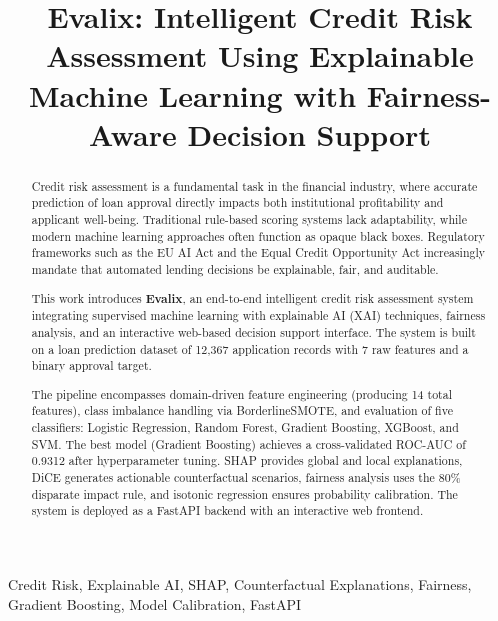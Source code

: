 \documentclass[journal]{IEEEtran}
\title{Evalix: Intelligent Credit Risk Assessment Using Explainable Machine Learning with Fairness-Aware Decision Support}
\author{
  \IEEEauthorblockN{Raswanthkrishna~M}
  \IEEEauthorblockA{
    Department of Computer Science Engineering -- Artificial Intelligence\\
    Amrita School of Artificial Intelligence,
    Amrita Vishwa Vidyapeetham, Coimbatore, India\\
    \textit{Guide: Sreekumar K.T., Assistant Professor}
  }
}
\begin{document}
\maketitle

\begin{abstract}
Credit risk assessment is a fundamental task in the financial industry, where accurate prediction of loan approval directly impacts both institutional profitability and applicant well-being. Traditional rule-based scoring systems lack adaptability, while modern machine learning approaches often function as opaque black boxes. Regulatory frameworks such as the EU AI Act and the Equal Credit Opportunity Act increasingly mandate that automated lending decisions be explainable, fair, and auditable.

This work introduces \textbf{Evalix}, an end-to-end intelligent credit risk assessment system integrating supervised machine learning with explainable AI (XAI) techniques, fairness analysis, and an interactive web-based decision support interface. The system is built on a loan prediction dataset of 12,367 application records with 7 raw features and a binary approval target.

The pipeline encompasses domain-driven feature engineering (producing 14 total features), class imbalance handling via BorderlineSMOTE, and evaluation of five classifiers: Logistic Regression, Random Forest, Gradient Boosting, XGBoost, and SVM. The best model (Gradient Boosting) achieves a cross-validated ROC-AUC of 0.9312 after hyperparameter tuning. SHAP provides global and local explanations, DiCE generates actionable counterfactual scenarios, fairness analysis uses the 80\% disparate impact rule, and isotonic regression ensures probability calibration. The system is deployed as a FastAPI backend with an interactive web frontend.
\end{abstract}

\begin{IEEEkeywords}
Credit Risk, Explainable AI, SHAP, Counterfactual Explanations, Fairness, Gradient Boosting, Model Calibration, FastAPI
\end{IEEEkeywords}


\end{document}
